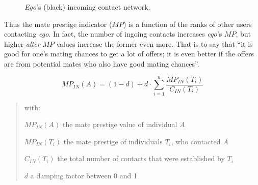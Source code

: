 \begin{figure}[h]
\begin{centering}
\par\end{centering}
\centering{}\caption{\textit{Ego}'s (black) incoming contact network.\label{fig:Ego's-(black)-incoming}}
\end{figure}
 Thus the mate prestige indicator ($MP$) is a function of the ranks
of other users contacting \textit{ego}. In fact, the number of ingoing
contacts increases \textit{ego}'s $MP$, but higher \textit{alter}
$MP$ values increase the former even more. That is to say that \textquotedblleft it
is good for one\textquoteright s mating chances to get a lot of offers;
it is even better if the offers are from potential mates who also
have good mating chances\textquotedblright .

\begin{equation}
MP_{IN}(A)=\left(1-d\right)+d\cdot\sum_{i=1}^{n}\frac{MP_{IN}(T_{i})}{C_{IN}(T_{i})}\label{eq:matevalue}
\end{equation}

\begin{spacing}{1}
\begin{verse}
{\footnotesize{}with:}{\footnotesize \par}

{\footnotesize{}$MP_{IN}(A)$ the mate prestige value of individual
$A$}{\footnotesize \par}

{\footnotesize{}$MP_{IN}(T_{i})$ the mate prestige of individuals
$T_{i}$, who contacted $A$}{\footnotesize \par}

{\footnotesize{}$C_{IN}(T_{i})$ the total number of contacts that
were established by $T_{i}$}{\footnotesize \par}

{\footnotesize{}$d$ a damping factor between 0 and 1}{\footnotesize \par}
\end{verse}
\end{spacing}

